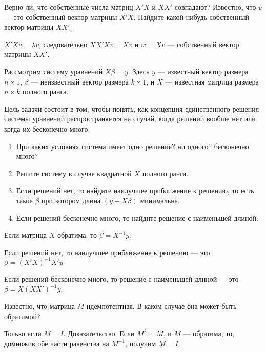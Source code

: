 \begin{problem}
Верно ли, что собственные числа матриц $X'X$ и $XX'$ совпадают?  Известно, что $v$ — это собственный вектор матрицы $X'X$. Найдите какой-нибудь собственный вектор матрицы $XX'$.
\begin{sol}
$X'Xv=\lambda v$, следовательно $XX'Xv=Xv$ и $w=Xv$ — собственный вектор матрицы $XX'$.
\end{sol}
\end{problem}

\begin{problem}
Рассмотрим систему уравнений $X\beta = y$. Здесь $y$ — известный вектор размера $n\times 1$, $\beta$ — неизвестный вектор размера $k\times 1$, и $X$ — известная матрица размера $n\times k$ полного ранга.

Цель задачи состоит в том, чтобы понять, как концепция единственного решения системы уравнений распространяется на случай, когда решений вообще нет или когда их бесконечно много.

\begin{enumerate}
\item При каких условиях система имеет одно решение? ни одного? бесконечно много?
\item Решите систему в случае квадратной $X$ полного ранга.
\item Если решений нет, то найдите наилучшее приближение к решению, то есть такое $\beta$ при котором длина $(y-X\beta)$ минимальна.
\item Если решений бесконечно много, то найдите решение с наименьшей длиной.
\end{enumerate}

\begin{sol}
Если матрица $X$ обратима, то $\beta = X^{-1}y$.

Если решений нет, то наилучшее приближение к решению — это $\beta = (X'X)^{-1}X'y$

Если решений бесконечно много, то решение с наименьшей длиной — это $\beta=X(XX')^{-1}y$.
\end{sol}
\end{problem}

\begin{problem}
  Известно, что матрица $M$ идемпотентная. В каком случае она может быть обратимой?
\begin{sol}
  Только если $M=I$. Доказательство. Если $M^2=M$, и $M$ — обратима, то, домножив обе части равенства на $M^{-1}$, получим $M=I$.
\end{sol}
\end{problem}



